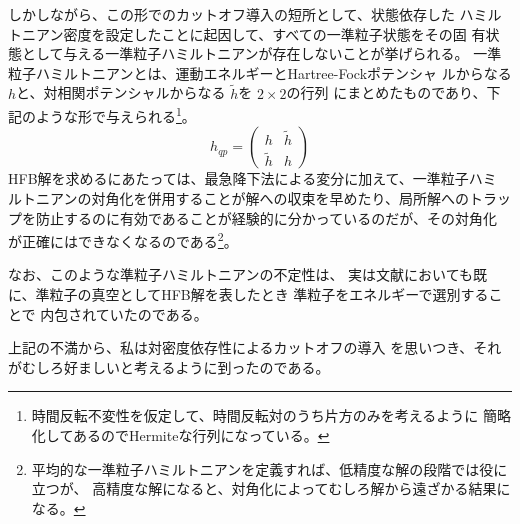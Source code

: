しかしながら、この形でのカットオフ導入の短所として、状態依存した
ハミルトニアン密度を設定したことに起因して、すべての一準粒子状態をその固
有状態として与える一準粒子ハミルトニアンが存在しないことが挙げられる。
一準粒子ハミルトニアンとは、運動エネルギーとHartree-Fockポテンシャ
ルからなる$h$と、対相関ポテンシャルからなる $\tilde{h}$を $2 \times 2$の行列
にまとめたものであり、下記のような形で与えられる\footnote{
%
時間反転不変性を仮定して、時間反転対のうち片方のみを考えるように
簡略化してあるのでHermiteな行列になっている。
%
}。
%
\begin{equation}
 h_{qp} = 
\left(
\begin{array}{cc}
h & \tilde{h} \\
\tilde{h}& h
\end{array}
\right)
\end{equation}
%
HFB解を求めるにあたっては、最急降下法による変分に加えて、一準粒子ハミ
ルトニアンの対角化を併用することが解への収束を早めたり、局所解へのトラッ
プを防止するのに有効であることが経験的に分かっているのだが、その対角化
が正確にはできなくなるのである\footnote{
%
平均的な一準粒子ハミルトニアンを定義すれば、低精度な解の段階では役に立つが、
高精度な解になると、対角化によってむしろ解から遠ざかる結果になる。
%
}。

なお、このような準粒子ハミルトニアンの不定性は、
実は文献\cite{DFT84}においても既に、準粒子の真空としてHFB解を表したとき
準粒子をエネルギーで選別することで
内包されていたのである\cite{Rin99}。

上記の不満から、私は対密度依存性によるカットオフの導入
を思いつき、それがむしろ好ましいと考えるように到ったのである。


